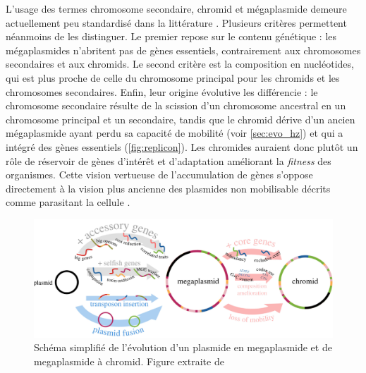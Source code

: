 L’usage des termes chromosome secondaire, chromid et mégaplasmide demeure actuellement peu standardisé dans la littérature \cite{hall_what_2021}. Plusieurs critères permettent néanmoins de les distinguer. Le premier repose sur le contenu génétique : les mégaplasmides n’abritent pas de gènes essentiels, contrairement aux chromosomes secondaires et aux chromids. Le second critère est la composition en nucléotides, qui est plus proche de celle du chromosome principal pour les chromids et les chromosomes secondaires. Enfin, leur origine évolutive les différencie : le chromosome secondaire résulte de la scission d’un chromosome ancestral en un chromosome principal et un secondaire, tandis que le chromid dérive d’un ancien mégaplasmide ayant perdu sa capacité de mobilité (voir \autoref{sec:evo_hz}) et qui a intégré des gènes essentiels (\autoref{fig:replicon}). Les chromides auraient donc plutôt un rôle de réservoir de gènes d'intérêt et d'adaptation améliorant la \textit{fitness} des organismes. Cette vision vertueuse de l'accumulation de gènes s'oppose directement à la vision plus ancienne des plasmides non mobilisable décrits comme parasitant la cellule \cite{levin_accessory_1993,lili_persistence_2007}.

\begin{figure}[htbp]
    \centering
    \includegraphics[width=0.8\linewidth]{images/replicon.jpg}
    \caption[Évolution d'un plasmide en chromid]{Schéma simplifié de l'évolution d'un plasmide en megaplasmide et de megaplasmide à chromid. Figure extraite de \cite{hall_what_2021}}
    \label{fig:replicon}
\end{figure}

